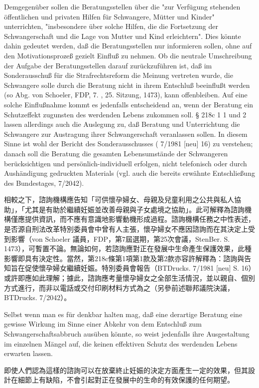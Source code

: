 \documentclass[12pt]{article}
\begin{document}
\syncleft
\begin{sourcepara}
Demgegenüber sollen die Beratungsstellen über die "zur Verfügung stehenden öffentlichen und privaten Hilfen für Schwangere, Mütter und Kinder" unterrichten, "insbesondere über solche Hilfen, die die Fortsetzung der Schwangerschaft und die Lage von Mutter und Kind erleichtern". Dies könnte dahin gedeutet werden, daß die Beratungsstellen nur informieren sollen, ohne auf den Motivationsprozeß gezielt Einfluß zu nehmen. Ob die neutrale Umschreibung der Aufgabe der Beratungsstellen darauf zurückzuführen ist, daß im Sonderausschuß für die Strafrechtsreform die Meinung vertreten wurde, die Schwangere solle durch die Beratung nicht in ihrem Entschluß beeinflußt werden (so Abg. von Schoeler, FDP, 7. \abbrWp{}, 25. Sitzung, \abbrStenBer{} \abbrS{} 1473), kann offenbleiben. Auf eine solche Einflußnahme kommt es jedenfalls entscheidend an, wenn der Beratung ein Schutzeffekt zugunsten des werdenden Lebens zukommen soll. § 218c \abbrAbs{} 1 \abbrNr{} 1 und 2 lassen allerdings auch die Auslegung zu, daß Beratung und Unterrichtung die Schwangere zur Austragung ihrer Schwangerschaft veranlassen sollen. In diesem Sinne ist wohl der Bericht des Sonderausschusses (\abbrBTDrucks{} 7/1981 [neu] \abbrS{} 16) zu verstehen; danach soll die Beratung die gesamten Lebensumstände der Schwangeren berücksichtigen und persönlich-individuell erfolgen, nicht telefonisch oder durch Aushändigung gedruckten Materials (vgl. auch die bereits erwähnte Entschließung des Bundestages, \abbrBTDrucks{} 7/2042).
\end{sourcepara}
\begin{transpara}
相較之下，諮詢機構應告知「可供懷孕婦女、母親及兒童利用之公共與私人協助」，「尤其是有助於繼續妊娠並改善母親與子女處境之協助」。此可解釋為諮詢機構僅應提供資訊，而不應有意識地影響動機形成過程。諮詢機構任務之中性表述，是否源自刑法改革特別委員會中曾有人主張，懷孕婦女不應因諮詢而在其決定上受到影響（von Schoeler 議員，FDP，第7屆選期，第25次會議，StenBer. S. 1473），可暫置不論。無論如何，若諮詢應對正在發展中生命產生保護效果，此種影響即具有決定性。當然，第218c條第1項第1款及第2款亦容許解釋為：諮詢與告知旨在促使懷孕婦女繼續妊娠。特別委員會報告（BTDrucks. 7/1981 [neu] S. 16）或許即應如此理解；據此，諮詢應考量懷孕婦女之全部生活情況，並以親自、個別方式進行，而非以電話或交付印刷材料方式為之（另參前述聯邦議院決議，BTDrucks. 7/2042）。
\end{transpara}

\syncleft
\begin{sourcepara}
Selbst wenn man es für denkbar halten mag, daß eine derartige Beratung eine gewisse Wirkung im Sinne einer Abkehr von dem Entschluß zum Schwangerschaftsabbruch ausüben könnte, so weist jedenfalls ihre Ausgestaltung im einzelnen Mängel auf, die keinen effektiven Schutz des werdenden Lebens erwarten lassen.
\end{sourcepara}
\begin{transpara}
即使人們認為這樣的諮詢可以在放棄終止妊娠的決定方面產生一定的效果，但其設計在細節上有缺陷，不會引起對正在發展中的生命的有效保護的任何期望。
\end{transpara}
\end{document}
